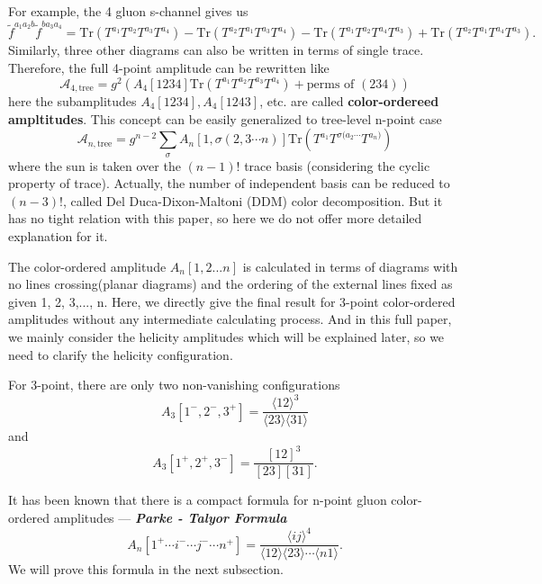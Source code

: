\documentclass[12pt]{article}
\numberwithin{equation}{section}
\newcommand{\mdavg}[2]{\langle #1 \rangle\!\langle #2 \rangle}
\newcommand{\avg}[1]{\langle #1 \rangle}
\begin{document}
For example, the 4 gluon s-channel gives us
\begin{equation}
    \tilde{f}^{a_1a_2b}\tilde{f}^{ba_3a_4}=\mathrm{Tr}(T^{a_1}T^{a_2}T^{a_3}T^{a_4})-\mathrm{Tr}(T^{a_2}T^{a_1}T^{a_3}T^{a_4})-\mathrm{Tr}(T^{a_1}T^{a_2}T^{a_4}T^{a_3})+\mathrm{Tr}(T^{a_2}T^{a_1}T^{a_4}T^{a_3}).
\end{equation}
Similarly, three other diagrams can also be written in terms of single trace. Therefore, the full 4-point amplitude can be rewritten like
\begin{equation}
    \mathcal{A}_{4,\text{tree}}=g^2(A_4[1234]\mathrm{Tr}(T^{a_1}T^{a_2}T^{a_3}T^{a_4})+\text{perms of } (234) )
\end{equation}
here the subamplitudes $A_4[1234],A_4[1243]$, etc. are called \textbf{color-ordereed ampltitudes}. This concept can be easily generalized to tree-level n-point case
\begin{equation}
    \mathcal{A}_{n,\text{tree}}=g^{n-2}\sum_{\sigma}A_n[1,\sigma(2,3\cdots n)]\mathrm{Tr}(T^{a_1}T^{\sigma(a_2\cdots}T^{a_n)})
    \label{2.29}
\end{equation}
where the sun is taken over the $(n-1)!$ trace basis (considering the cyclic property of trace). Actually, the number of independent basis can be reduced to $(n-3)!$, called Del Duca-Dixon-Maltoni (DDM) color decomposition\cite{DelDuca:1999rs}. But it has no tight relation with this paper, so here we do not offer more detailed explanation for it. 

The color-ordered amplitude $A_n[1,2 ... n]$ is calculated in terms of diagrams with no lines crossing(planar diagrams) and the ordering of the external lines fixed as given 1, 2, 3,..., n. Here, we directly give the final result for 3-point color-ordered amplitudes without any intermediate calculating process. And in this full paper, we mainly consider the helicity amplitudes which will be explained later, so we need to clarify the helicity configuration.

For 3-point, there are only two non-vanishing configurations
\begin{equation}
    A_3[1^-,2^-,3^+]=\frac{\avg{12}^3}{\mdavg{23}{31}}
\end{equation}
and 
\begin{equation}
    A_3[1^+,2^+,3^-]=\frac{[12]^3}{[23][31]}.
\end{equation}

It has been known that there is a compact formula for n-point gluon color-ordered amplitudes --- \textbf{\textit{Parke - Talyor Formula}}
\begin{equation}
    A_n[1^+\cdots i^-\cdots j^- \cdots n^+]=\frac{\avg{ij}^4}{\mdavg{12}{23}\cdots\avg{n1}}.
\end{equation}
We will prove this formula in the next subsection.
\end{document}
